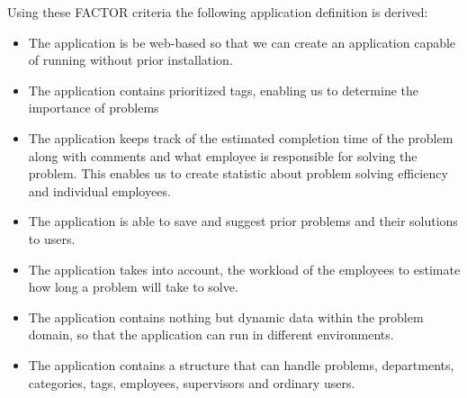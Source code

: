 Using these FACTOR criteria the following application definition is derived:
\begin{itemize}
\item The application is be web-based so that we can create an application capable of running without prior installation.
\item The application contains prioritized tags, enabling us to determine the importance of problems
\item The application keeps track of the estimated completion time of the problem along with comments and what employee is responsible for solving the problem. This enables us to create statistic about problem solving efficiency and individual employees.
\item The application is able to save and suggest prior problems and their solutions to users.
\item The application takes into account, the workload of the employees to estimate how long a problem will take to solve.
\item The application contains nothing but dynamic data within the problem domain, so that the application can run in different environments.
\item The application contains a structure that can handle problems, departments, categories, tags, employees, supervisors and ordinary users.
\end{itemize}


\begin{comment}
Using these FACTOR criteria, we arrive at the following application definition:
\begin{itemize}
\item The application is be web-based so that we can create an application capable of running without prior installation.
\item The application should contain prioritized tags, enabling us to determine the importance of problems
\item The application should keep track of the estimated completion time of the problem along with comments and what employee is responsible for the problem. This will enable us to create statistic about problem solving efficiency and individual employees.
\item The application should be able to save and suggest prior problems and their solutions to users.
\item The application should take into account, the workload of the employees to estimate how long a problem will take to solve.
\item The application should should contain nothing but dynamic data within the problem domain, so that the application can run in different environments.
\item The application should contain a structure that can handle problems, departments, categories, tags, employees, supervisors and ordinary users.
\end{itemize}
\end{comment}


